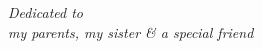 
\vspace*{\fill}

\begin{center}
{\it Dedicated to}\\
{\it my parents, my sister \& a special friend}
\end{center}

\vspace*{\fill}
